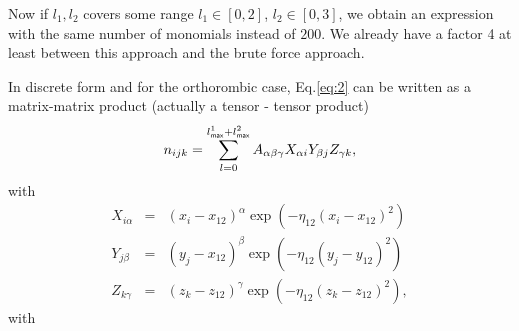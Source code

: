 \documentclass[prb]{revtex4}
\begin{document}
Now if $l_1, l_2$ covers some range $l_1\in \left[0, 2\right]$, $l_2\in \left[0,
  3\right]$, we obtain an expression with the same number of monomials instead
of $200$. We already have a factor 4 at least between this approach and the
brute force approach.

In discrete form and for the orthorombic case, Eq.\ref{eq:2} can be written as a
matrix-matrix product (actually a tensor - tensor product)
\begin{equation}
  \label{eq:3}
  n_{ijk} = \sum_{l = 0}^{l^1_{\sf max} + l^2_{\sf max}}  A_{\alpha\beta\gamma} X_{\alpha i} Y_{\beta j} Z_{\gamma k},
\end{equation}
with
\begin{eqnarray}
  X_{i\alpha} &=& (x_i - x_{12})^\alpha \exp(-\eta_{12} (x_i-x_{12})^2)\\
  Y_{j\beta} &=& (y_j - x_{12})^\beta \exp(-\eta_{12} (y_j - y_{12})^2)\\
  Z_{k\gamma} &=& (z_k - z_{12})^\gamma \exp(-\eta_{12} (z_k-z_{12})^2),
\end{eqnarray}
with
\end{document}
